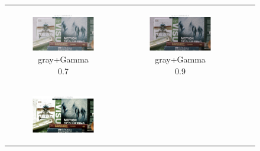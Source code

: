 \documentclass[11pt, a4]{article}
\begin{document}
\begin{enumerate}
\begin{figure}[h]
{\begin{tabular}{cccc}
						\begin{subfigure}[h]{0.45\linewidth}
							\centering
							\includegraphics[width=\linewidth]{../output/RawImage1_Tone_gray_Gamma0.5.pdf}
							\caption{gray+Gamma 0.7}
							\label{fig:RawImage1_tone_3}
						\end{subfigure} &
						\begin{subfigure}[h]{0.45\linewidth}
							\centering
							\includegraphics[width=\linewidth]{../output/RawImage1_Tone_gray_Gamma0.9.pdf}
							\caption{gray+Gamma 0.9}
							\label{fig:RawImage1_tone_4}
						\end{subfigure}\\
						\begin{subfigure}[h]{0.45\linewidth}
							\centering
							\includegraphics[width=\linewidth]{../output/RawImage1_Tone_whitepatch_HistEq.pdf}

\end{subfigure}
\end{tabular}}
\end{figure}
\end{enumerate}
\end{document}

